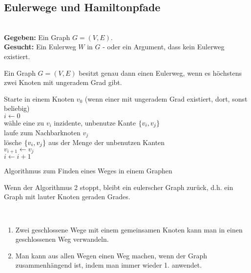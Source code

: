 	\subsection{Eulerwege und Hamiltonpfade}
	\begin{problem}[Eulerweg]~\\[5pt]
		\hspace*{10pt}\textbf{Gegeben: } Ein Graph $G = (V, E)$.\\[5pt]
		\hspace*{10pt}\textbf{Gesucht: } Ein Eulerweg $W$ in $G$ -  oder ein Argument, dass kein Eulerweg existiert.
	\end{problem}
	\begin{satz}
		Ein Graph $G = (V, E)$ besitzt genau dann einen Eulerweg, wenn es höchstens zwei Knoten mit ungeradem Grad gibt.
	\end{satz}
	\begin{algorithm}
		\vspace*{5pt}
		Starte in einem Knoten $v_0$ \newline(wenn einer mit ungeradem Grad existiert, dort, sonst beliebig)\\
		$i \leftarrow 0$\\
		{wähle eine zu $v_i$ inzidente, unbenutze Kante $\{v_i, v_j\}$\\
		laufe zum Nachbarknoten $v_j$\\
		lösche $\{v_i, v_j\}$ aus der Menge der unbenutzen Kanten\\
		$v_{i+1} \leftarrow v_j$\\
		$i \leftarrow i+1$
		}
		\caption{Algorithmus zum Finden eines Weges in einem Graphen}
	\end{algorithm}
	\begin{satz}
		Wenn der Algorithmus 2 stoppt, bleibt ein eulerscher Graph zurück, d.h. ein Graph mit lauter Knoten geraden Grades.
	\end{satz}
	\begin{korollar}~
		\begin{enumerate}
			\item Zwei geschlossene Wege mit einem gemeinsamen Knoten kann man in einen geschlossenen Weg verwandeln.
			\item Man kann aus allen Wegen einen Weg machen, wenn der Graph zusammenhängend ist, indem man immer wieder 1. anwendet.
		\end{enumerate}
	\end{korollar}
